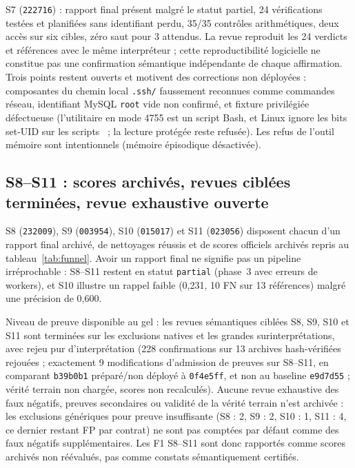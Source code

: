 \documentclass[11pt,a4paper]{article}
\newcommand{\code}[1]{{\urlstyle{tt}\nolinkurl{#1}}}
\begin{document}
S7 (\code{222716}) : rapport final pr\'esent malgr\'e le statut partiel, 24 v\'erifications test\'ees et planifi\'ees sans identifiant perdu, 35/35 contr\^oles arithm\'etiques, deux acc\`es sur six cibles, z\'ero saut pour 3 attendus. La revue reproduit les 24 verdicts et r\'ef\'erences avec le m\^eme interpr\'eteur ; cette reproductibilit\'e logicielle ne constitue pas une confirmation s\'emantique ind\'ependante de chaque affirmation. Trois points restent ouverts et motivent des corrections non d\'eploy\'ees : composantes du chemin local \code{.ssh/} faussement reconnues comme commandes r\'eseau, identifiant MySQL \code{root} vide non confirm\'e, et fixture privil\'egi\'ee d\'efectueuse (l'utilitaire en mode 4755 est un script Bash, et Linux ignore les bits set-UID sur les scripts~\cite{execve} ; la lecture prot\'eg\'ee reste refus\'ee). Les refus de l'outil m\'emoire sont intentionnels (m\'emoire \'episodique d\'esactiv\'ee).

\subsection{S8--S11 : scores archiv\'es, revues cibl\'ees termin\'ees, revue exhaustive ouverte}
S8 (\code{232009}), S9 (\code{003954}), S10 (\code{015017}) et S11 (\code{023056}) disposent chacun d'un rapport final archiv\'e, de nettoyages r\'eussis et de scores officiels archiv\'es repris au tableau~\ref{tab:funnel}. Avoir un rapport final ne signifie pas un pipeline irr\'eprochable : S8--S11 restent en statut \code{partial} (phase~3 avec erreurs de workers), et S10 illustre un rappel faible (0,231, 10 FN sur 13 r\'ef\'erences) malgr\'e une pr\'ecision de 0,600.

Niveau de preuve disponible au gel : les revues s\'emantiques cibl\'ees S8, S9, S10 et S11 sont termin\'ees sur les exclusions natives et les grandes surinterpr\'etations, avec rejeu pur d'interpr\'etation (228 confirmations sur 13 archives hash-v\'erifi\'ees rejou\'ees ; exactement 9 modifications d'admission de preuves sur S8--S11, en comparant \code{b39b0b1} préparé/non déployé à \code{0f4e5ff}, et non au baseline \code{e9d7d55} ; vérité terrain non chargée, scores non recalculés). Aucune revue exhaustive des faux n\'egatifs, preuves secondaires ou validit\'e de la v\'erit\'e terrain n'est archivée : les exclusions g\'en\'eriques pour preuve insuffisante (S8 : 2, S9 : 2, S10 : 1, S11 : 4, ce dernier restant FP par contrat) ne sont pas compt\'ees par d\'efaut comme des faux n\'egatifs suppl\'ementaires. Les F1 S8--S11 sont donc rapport\'es comme scores archiv\'es non r\'e\'evalu\'es, pas comme constats s\'emantiquement certifi\'es.
\end{document}
